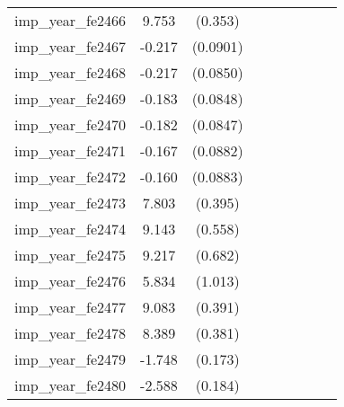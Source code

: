 {\begin{tabular}{l*{4}{cc}}
imp\_year\_fe2466&    9.753\sym{***}&  (0.353)&                  &         &                  &         &                  &         \\
imp\_year\_fe2467&   -0.217\sym{*}  & (0.0901)&                  &         &                  &         &                  &         \\
imp\_year\_fe2468&   -0.217\sym{*}  & (0.0850)&                  &         &                  &         &                  &         \\
imp\_year\_fe2469&   -0.183\sym{*}  & (0.0848)&                  &         &                  &         &                  &         \\
imp\_year\_fe2470&   -0.182\sym{*}  & (0.0847)&                  &         &                  &         &                  &         \\
imp\_year\_fe2471&   -0.167         & (0.0882)&                  &         &                  &         &                  &         \\
imp\_year\_fe2472&   -0.160         & (0.0883)&                  &         &                  &         &                  &         \\
imp\_year\_fe2473&    7.803\sym{***}&  (0.395)&                  &         &                  &         &                  &         \\
imp\_year\_fe2474&    9.143\sym{***}&  (0.558)&                  &         &                  &         &                  &         \\
imp\_year\_fe2475&    9.217\sym{***}&  (0.682)&                  &         &                  &         &                  &         \\
imp\_year\_fe2476&    5.834\sym{***}&  (1.013)&                  &         &                  &         &                  &         \\
imp\_year\_fe2477&    9.083\sym{***}&  (0.391)&                  &         &                  &         &                  &         \\
imp\_year\_fe2478&    8.389\sym{***}&  (0.381)&                  &         &                  &         &                  &         \\
imp\_year\_fe2479&   -1.748\sym{***}&  (0.173)&                  &         &                  &         &                  &         \\
imp\_year\_fe2480&   -2.588\sym{***}&  (0.184)&                  &         &                  &         &                  &         \\

\end{tabular}}

